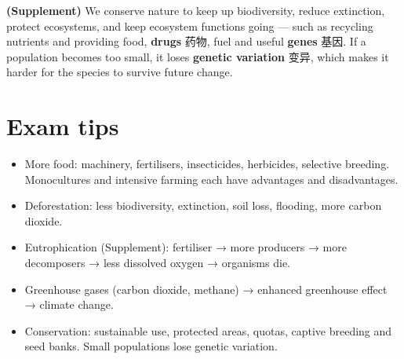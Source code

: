 \documentclass[11pt]{article}
\begin{document}
\textbf{(Supplement)} We conserve nature to keep up biodiversity, reduce extinction, protect ecosystems, and keep ecosystem functions going — such as recycling nutrients and providing food, \textbf{drugs} 药物, fuel and useful \textbf{genes} 基因. If a population becomes too small, it loses \textbf{genetic variation} 变异, which makes it harder for the species to survive future change.

\section*{Exam tips}

\begin{itemize}
\item More food: machinery, fertilisers, insecticides, herbicides, selective breeding. Monocultures and intensive farming each have advantages and disadvantages.

\item Deforestation: less biodiversity, extinction, soil loss, flooding, more carbon dioxide.

\item Eutrophication (Supplement): fertiliser → more producers → more decomposers → less dissolved oxygen → organisms die.

\item Greenhouse gases (carbon dioxide, methane) → enhanced greenhouse effect → climate change.

\item Conservation: sustainable use, protected areas, quotas, captive breeding and seed banks. Small populations lose genetic variation.

\end{itemize}
\end{document}

